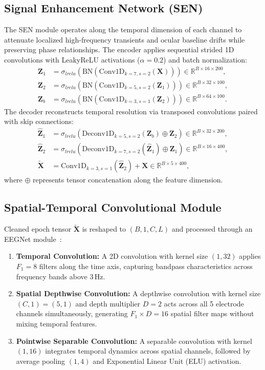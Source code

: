 \documentclass[conference]{IEEEtran}
\begin{document}
\subsection{Signal Enhancement Network (SEN)}
The SEN module operates along the temporal dimension of each channel to attenuate localized high-frequency transients and ocular baseline drifts while preserving phase relationships. The encoder applies sequential strided 1D convolutions with LeakyReLU activations ($\alpha=0.2$) and batch normalization:
\begin{align}
    \mathbf{Z}_1 &= \sigma_{lrelu}\left( \text{BN}\left( \text{Conv1D}_{k=7, s=2}(\mathbf{X}) \right) \right) \in \mathbb{R}^{B \times 16 \times 200}, \\
    \mathbf{Z}_2 &= \sigma_{lrelu}\left( \text{BN}\left( \text{Conv1D}_{k=5, s=2}(\mathbf{Z}_1) \right) \right) \in \mathbb{R}^{B \times 32 \times 100}, \\
    \mathbf{Z}_b &= \sigma_{lrelu}\left( \text{BN}\left( \text{Conv1D}_{k=3, s=1}(\mathbf{Z}_2) \right) \right) \in \mathbb{R}^{B \times 64 \times 100}.
\end{align}
The decoder reconstructs temporal resolution via transposed convolutions paired with skip connections:
\begin{align}
    \mathbf{\hat{Z}}_1 &= \sigma_{lrelu}\left( \text{Deconv1D}_{k=5, s=2}(\mathbf{Z}_b) \oplus \mathbf{Z}_2 \right) \in \mathbb{R}^{B \times 32 \times 200}, \\
    \mathbf{\hat{Z}}_2 &= \sigma_{lrelu}\left( \text{Deconv1D}_{k=7, s=2}(\mathbf{\hat{Z}}_1) \oplus \mathbf{Z}_1 \right) \in \mathbb{R}^{B \times 16 \times 400}, \\
    \mathbf{\tilde{X}} &= \text{Conv1D}_{k=3, s=1}(\mathbf{\hat{Z}}_2) + \mathbf{X} \in \mathbb{R}^{B \times 5 \times 400},
\end{align}
where $\oplus$ represents tensor concatenation along the feature dimension.

\subsection{Spatial-Temporal Convolutional Module}
Cleaned epoch tensor $\mathbf{\tilde{X}}$ is reshaped to $(B, 1, C, L)$ and processed through an EEGNet module~\cite{lawhern2018eegnet}:
\begin{enumerate}[leftmargin=*]
    \item \textbf{Temporal Convolution:} A 2D convolution with kernel size $(1, 32)$ applies $F_1 = 8$ filters along the time axis, capturing bandpass characteristics across frequency bands above $3\,\text{Hz}$.
    \item \textbf{Spatial Depthwise Convolution:} A depthwise convolution with kernel size $(C, 1) = (5, 1)$ and depth multiplier $D = 2$ acts across all 5 electrode channels simultaneously, generating $F_1 \times D = 16$ spatial filter maps without mixing temporal features.
    \item \textbf{Pointwise Separable Convolution:} A separable convolution with kernel $(1, 16)$ integrates temporal dynamics across spatial channels, followed by average pooling $(1, 4)$ and Exponential Linear Unit (ELU) activation.
\end{enumerate}
\end{document}
